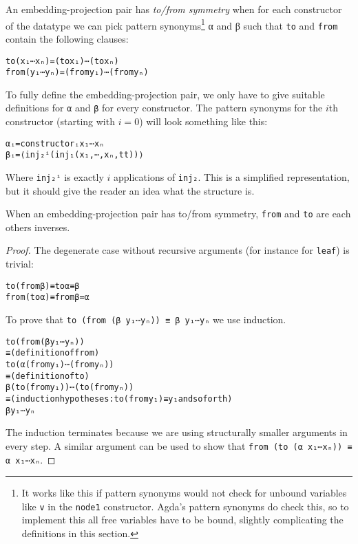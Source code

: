 \begin{definition}
An embedding-projection pair has \emph{to/from symmetry} when for each
constructor of the datatype we can pick pattern
synonyms\footnote{It works like this if pattern synonyms would not
  check for unbound variables like \texttt{v} in the \texttt{node1}
  constructor.
  Agda's pattern synonyms do check this, so to implement this all free
  variables have to be bound, slightly complicating the definitions in
  this section.}
α and β such that \texttt{to} and \texttt{from} contain the following
clauses:

\begin{alltt}
to  ( x₁⋯xₙ) =  (to  x₁)⋯(to  xₙ)
from  ( y₁⋯yₙ) =  (from  y₁)⋯(from  yₙ)
\end{alltt}
\end{definition}

To fully define the embedding-projection pair, we only have to give
suitable definitions for \texttt{α} and \texttt{β} for every
constructor.
The pattern synonyms for the $i$th constructor (starting with $i=0$)
will look something like this:

\begin{alltt}
αᵢ = constructorᵢ x₁⋯xₙ
βᵢ = ⟨ inj₂ⁱ (inj₁ (x₁ , ⋯ , xₙ , tt)) ⟩
\end{alltt}

Where \texttt{inj₂ⁱ} is exactly $i$ applications of \texttt{inj₂}.
This is a simplified representation, but it should give the reader
an idea what the structure is.

\begin{theorem}
When an embedding-projection pair has to/from symmetry, \texttt{from}
and \texttt{to} are each others inverses.
\end{theorem}
\begin{proof}


The degenerate case without recursive arguments (for instance for
\texttt{leaf}) is trivial:

\begin{alltt}
to  (from  β) ≡ to  α ≡ β
from  (to  α) ≡ from  β = α
\end{alltt}

To prove that \texttt{to  (from  (β y₁⋯yₙ)) ≡ β
  y₁⋯yₙ} we use induction.

\begin{alltt}
to  (from  (β y₁⋯yₙ))
  ≡ (definition of from)
to  (α (from  y₁)⋯(from  yₙ))
  ≡ (definition of to)
β (to  (from  y₁))⋯(to  (from  yₙ))
  ≡ (induction hypotheses: to  (from  y₁) ≡ y₁ and so forth)
β y₁⋯yₙ
\end{alltt}

The induction terminates because we are using structurally smaller
arguments in every step.
A similar argument can be used to show that
\texttt{from  (to  (α x₁⋯xₙ)) ≡ α x₁⋯xₙ}.
\end{proof}

